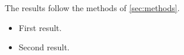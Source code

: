 
The results follow the methods of \autoref{sec:methods}.
\begin{itemize}
  \item First result.
  \item Second result.
\end{itemize}
